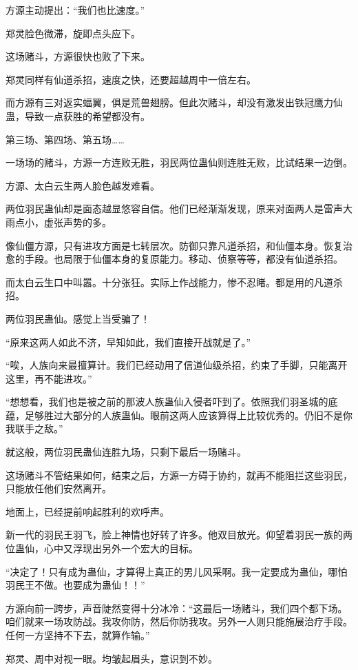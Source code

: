 \begin{this_body}
方源主动提出：“我们也比速度。”

郑灵脸色微滞，旋即点头应下。

这场赌斗，方源很快也败了下来。

郑灵同样有仙道杀招，速度之快，还要超越周中一倍左右。

而方源有三对返实蝠翼，俱是荒兽翅膀。但此次赌斗，却没有激发出铁冠鹰力仙蛊，导致一点获胜的希望都没有。

第三场、第四场、第五场……

一场场的赌斗，方源一方连败无胜，羽民两位蛊仙则连胜无败，比试结果一边倒。

方源、太白云生两人脸色越发难看。

两位羽民蛊仙却是面态越显悠容自信。他们已经渐渐发现，原来对面两人是雷声大雨点小，虚张声势的多。

像仙僵方源，只有进攻方面是七转层次。防御只靠凡道杀招，和仙僵本身。恢复治愈的手段。也局限于仙僵本身的复原能力。移动、侦察等等，都没有仙道杀招。

而太白云生口中叫嚣。十分张狂。实际上作战能力，惨不忍睹。都是用的凡道杀招。

两位羽民蛊仙。感觉上当受骗了！

“原来这两人如此不济，早知如此，我们直接开战就是了。”

“唉，人族向来最擅算计。我们已经动用了信道仙级杀招，约束了手脚，只能离开这里，再不能进攻。”

“想想看，我们也是被之前的那波人族蛊仙入侵者吓到了。依照我们羽圣城的底蕴，足够胜过大部分的人族蛊仙。眼前这两人应该算得上比较优秀的。仍旧不是你我联手之敌。”

就这般，两位羽民蛊仙连胜九场，只剩下最后一场赌斗。

这场赌斗不管结果如何，结束之后，方源一方碍于协约，就再不能阻拦这些羽民，只能放任他们安然离开。

地面上，已经提前响起胜利的欢呼声。

新一代的羽民王羽飞，脸上神情也好转了许多。他双目放光。仰望着羽民一族的两位蛊仙，心中又浮现出另外一个宏大的目标。

“决定了！只有成为蛊仙，才算得上真正的男儿风采啊。我一定要成为蛊仙，哪怕羽民王不做。也要成为蛊仙！！”

方源向前一跨步，声音陡然变得十分冰冷：“这最后一场赌斗，我们四个都下场。咱们就来一场攻防战。我攻你防，然后你防我攻。另外一人则只能施展治疗手段。任何一方坚持不下去，就算作输。”

郑灵、周中对视一眼。均皱起眉头，意识到不妙。


\end{this_body}
